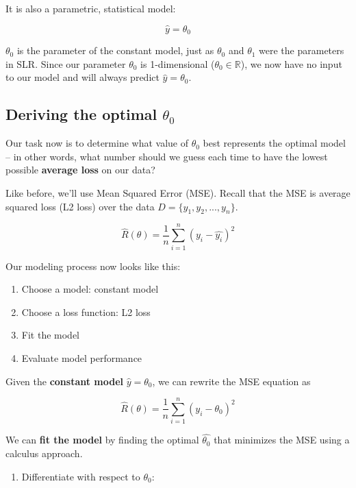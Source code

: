 \documentclass[
  letterpaper,
  DIV=11,
  numbers=noendperiod]{scrreprt}
\providecommand{\tightlist}{%
  \setlength{\itemsep}{0pt}\setlength{\parskip}{0pt}}\usepackage{longtable,booktabs,array}
\begin{document}
It is also a parametric, statistical model:

\[\hat{y} = \theta_0\]

\(\theta_0\) is the parameter of the constant model, just as
\(\theta_0\) and \(\theta_1\) were the parameters in SLR. Since our
parameter \(\theta_0\) is 1-dimensional (\(\theta_0 \in \mathbb{R}\)),
we now have no input to our model and will always predict
\(\hat{y} = \theta_0\).

\subsection{\texorpdfstring{Deriving the optimal
\(\theta_0\)}{Deriving the optimal \textbackslash theta\_0}}\label{deriving-the-optimal-theta_0}

Our task now is to determine what value of \(\theta_0\) best represents
the optimal model -- in other words, what number should we guess each
time to have the lowest possible \textbf{average loss} on our data?

Like before, we'll use Mean Squared Error (MSE). Recall that the MSE is
average squared loss (L2 loss) over the data
\(D = \{y_1, y_2, ..., y_n\}\).

\[\hat{R}(\theta) = \frac{1}{n}\sum^{n}_{i=1} (y_i - \hat{y_i})^2 \]

Our modeling process now looks like this:

\begin{enumerate}
\def\labelenumi{\arabic{enumi}.}
\tightlist
\item
  Choose a model: constant model
\item
  Choose a loss function: L2 loss
\item
  Fit the model
\item
  Evaluate model performance
\end{enumerate}

Given the \textbf{constant model} \(\hat{y} = \theta_0\), we can rewrite
the MSE equation as

\[\hat{R}(\theta) = \frac{1}{n}\sum^{n}_{i=1} (y_i - \theta_0)^2 \]

We can \textbf{fit the model} by finding the optimal \(\hat{\theta_0}\)
that minimizes the MSE using a calculus approach.

\begin{enumerate}
\def\labelenumi{\arabic{enumi}.}
\tightlist
\item
  Differentiate with respect to \(\theta_0\):
\end{enumerate}
\end{document}
